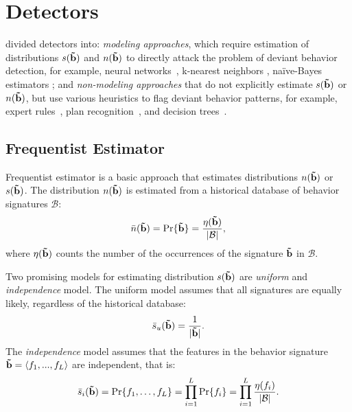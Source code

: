 %
%
\section{Detectors}
\cite{Helman1993} divided detectors into: \emph{modeling approaches}, which require estimation of distributions $s(\mathbf{\tilde{b}})$ and $n(\mathbf{\tilde{b}})$ to directly attack the problem of deviant behavior detection, for example, neural networks~\citep{Biermann2001}, k-nearest neighbors \citep{Govindarajan2009}, na\"ive-Bayes estimators \citep{Kruegel2003}; and \emph{non-modeling approaches} that do not explicitly estimate $s(\mathbf{\tilde{b}})$ or $n(\mathbf{\tilde{b}})$, but use various heuristics to flag deviant behavior patterns, for example, expert rules~\citep{Esponda2004}, plan recognition~\citep{Avrahami-Zilberbrand2007}, and decision trees~\citep{Ektefa2010}.


%
%
\subsection{Frequentist Estimator}
Frequentist estimator is a basic approach that estimates distributions $n(\mathbf{\tilde{b}})$ or $s(\mathbf{\tilde{b}})$. The distribution $n(\mathbf{\tilde{b}})$ is estimated from a historical database of behavior signatures $\mathcal{B}$:
\begin{equation}
		\bar{n}(\mathbf{\tilde{b}}) = \text{Pr}\{\mathbf{\tilde{b}}\} = \frac{\eta(\mathbf{\tilde{b}}) }{|\mathcal{B}|},
\label{eq:freq-n}
\end{equation}
\noindent
where $\eta(\mathbf{\tilde{b}})$ counts the number of the occurrences of the signature $\mathbf{\tilde{b}}$ in $\mathcal{B}$.

Two promising models for estimating distribution $s(\mathbf{\tilde{b}})$ are \emph{uniform} and \emph{independence} model.
The uniform model assumes that all signatures are equally likely, regardless of the historical database:
\begin{equation}
		\bar{s}_u(\mathbf{\tilde{b}}) = \frac{1}{|\mathbf{\tilde{b}}|}.
\label{eq:freq-n}
\end{equation}
\noindent
The \emph{independence} model assumes that the features in the behavior signature $\mathbf{\tilde{b}}=\langle f_1, ..., f_L \rangle$ are independent, that is:
\begin{equation}
		\bar{s}_i(\mathbf{\tilde{b}}) = \text{Pr}\{f_1, \dots, f_L\} = \prod_{i=1}^{L}{\text{Pr}\{f_i\}}  = \prod_{i=1}^{L}\frac{\eta(f_i)}{|\mathcal{B}|}.
\label{eq:freq-n}
\end{equation}

